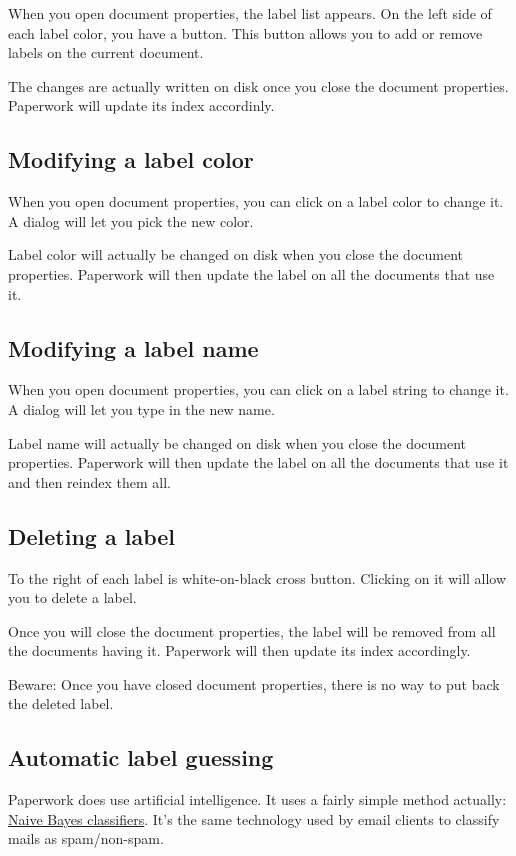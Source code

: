 \documentclass[10pt,a4paper]{article}
\begin{document}
When you open document properties, the label list appears. On the left side
of each label color, you have a button. This button allows you to add or
remove labels on the current document.

The changes are actually written on disk once you close the document
properties. Paperwork will update its index accordinly.


\subsection{Modifying a label color}

When you open document properties, you can click on a label color to change
it. A dialog will let you pick the new color.

Label color will actually be changed on disk when you close the document
properties. Paperwork will then update the label on all the documents that use
it.


\subsection{Modifying a label name}

When you open document properties, you can click on a label string to change
it. A dialog will let you type in the new name.

Label name will actually be changed on disk when you close the document
properties. Paperwork will then update the label on all the documents that use
it and then reindex them all.


\subsection{Deleting a label}

To the right of each label is white-on-black cross button. Clicking on it
will allow you to delete a label.

Once you will close the document properties, the label will be removed from
all the documents having it. Paperwork will then update its index accordingly.

Beware: Once you have closed document properties, there is no way to put back
the deleted label.


\subsection{Automatic label guessing}

Paperwork does use artificial intelligence. It uses a fairly simple method
actually:
\href{https://en.wikipedia.org/wiki/Naive_Bayes_classifier}{Naive Bayes classifiers}.
It's the same technology used by email clients to classify mails as spam/non-spam.
\end{document}
